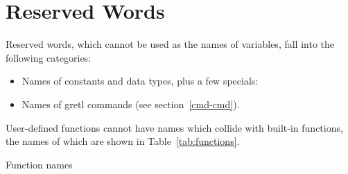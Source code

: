 \chapter{Reserved Words}
\label{reswords}

Reserved words, which cannot be used as the names of variables, fall
into the following categories:

\begin{itemize}
\item Names of constants and data types, plus a few specials:
  
  
\item Names of gretl commands (see section~\ref{cmd-cmd}).
\end{itemize}

User-defined functions cannot have names which collide with built-in
functions, the names of which are shown in Table~\ref{tab:functions}.

\begin{table}[htbp]
\caption{Function names}
\label{tab:functions}
\begin{center}

\end{center}
\end{table}

